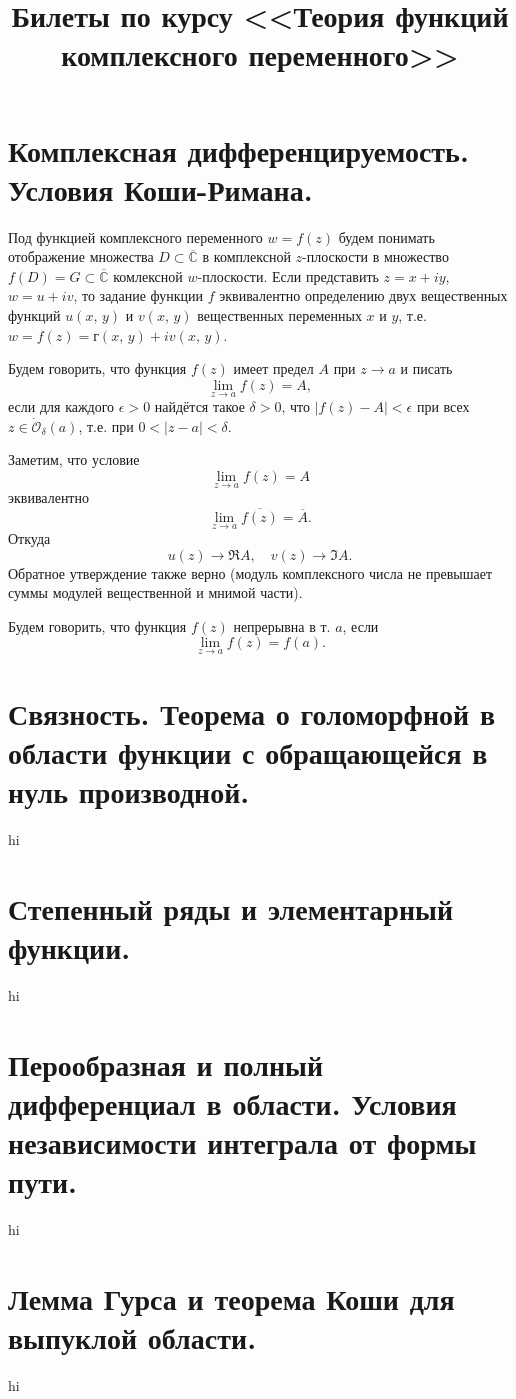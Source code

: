 \documentclass[a4paper]{article}
\title{Билеты по курсу <<Теория функций комплексного
переменного>>	}
\begin{document}
	\maketitle
	\tableofcontents
\section{Комплексная дифференцируемость. Условия Коши-Римана.}
Под функцией комплексного переменного $w=f(z)$ будем понимать
отображение множества $D \subset \overline{\mathbb{C}}$ в
комплексной $z$-плоскости в множество $f(D)=G \subset \overline{
\mathbb{C}}$ комлексной $w$-плоскости. Если представить
$z= x+iy$, $w=u+iv$, то задание функции $f$ эквивалентно
определению двух вещественных функций $u(x,\,y)$ и $v(x,\,y)$
вещественных переменных $x$ и $y$, т.\:е. $w=f(z)=
г(x,\,y)+iv(x,\,y)$.
\begin{dfn}
	Будем говорить, что функция $f(z)$ имеет предел
	$A$ при $z\to a$ и писать
	\[
		\lim_{z \to a} f(z)=A
	,\]
	если для каждого $\epsilon >0$ найдётся такое
	$\delta >0$, что $|f(z)-A|<\epsilon $ при
	всех $z \in \dot{\mathcal{O}}_\delta (a)$, т.\:е.
	при $0<|z-a|<\delta$.
\end{dfn}
Заметим, что условие
\[
		\lim_{z \to a} f(z)=A
	\]
эквивалентно
\[
	\lim_{z \to a} \overline{f(z)}=\overline{A}.
	\]
Откуда
\[
	u(z) \to  \Re  A, \quad v(z)\to  \Im  A
.\] 
Обратное утверждение также верно (модуль комплексного числа
не превышает суммы модулей вещественной и мнимой части).
\begin{dfn}
	Будем говорить, что функция $f(z)$ непрерывна в т. $a$,
	если
\[\lim_{z \to a} f(z)=f(a).\]
\end{dfn}
\section{Связность. Теорема о голоморфной в области функции
с обращающейся в нуль производной.}
hi
\section{Степенный ряды и элементарный функции.}
hi
\section{Перообразная и полный дифференциал в области. Условия
независимости интеграла от формы пути.}
hi
\section{Лемма Гурса и теорема Коши для выпуклой области.}
hi
\end{document}
